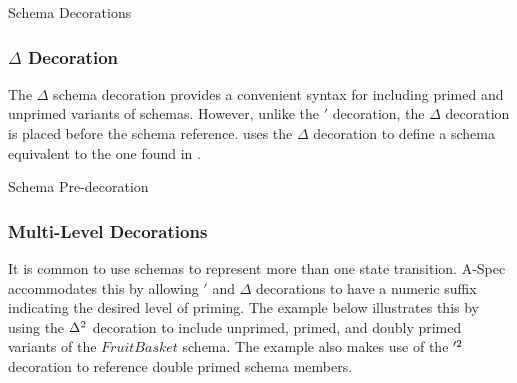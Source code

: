 \documentclass[letterpaper,10pt,draft]{book}
\begin{document}
\begin{example}
\begin{minipage}[t]{0.49\linewidth}
   
\end{minipage}
\begin{minipage}[t]{0.49\linewidth}
   \azsch
   
\end{minipage}

   \caption{Schema Decorations}
   \label{ex:SchemaDecor}
\end{example}

\subsubsection{$\Delta$ Decoration}
   \label{sect:DeltaDecor}

The $\Delta$ schema decoration provides a convenient syntax for including primed
and unprimed variants of schemas.  However, unlike the $'$ decoration, the $\Delta$
decoration is placed before the schema reference.   uses the
$\Delta$ decoration to define a schema equivalent to the one found in .

\begin{example}
\begin{minipage}[t]{0.49\linewidth}
   
\end{minipage}
\begin{minipage}[t]{0.49\linewidth}
   \azsch
   
\end{minipage}

   \caption{Schema Pre-decoration}
   \label{ex:SchemaDelta}
\end{example}

\subsubsection{Multi-Level Decorations}
   \label{sect:MultiDecor}

It is common to use schemas to represent more than one state transition.  A-Spec
accommodates this by allowing $'$ and $\Delta$ decorations to have a numeric suffix
indicating the desired level of priming.  The example below illustrates this by
using the $\Delta^{{2}}$ decoration to include unprimed, primed, and doubly primed
variants of the $FruitBasket$ schema.  The example also makes use of the $'^{{2}}$
decoration to reference double primed schema members.
\end{document}
